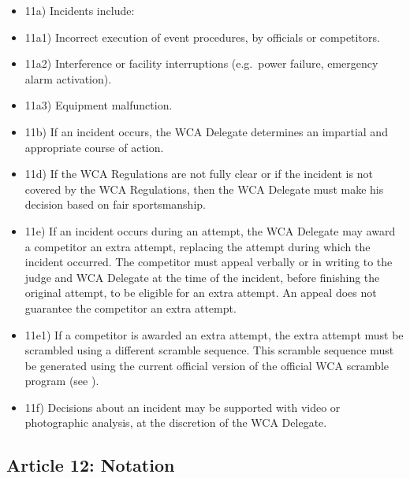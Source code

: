 \begin{itemize}
\item
  11a) Incidents include:
\item
  11a1) Incorrect execution of event procedures, by officials or
  competitors.
\item
  11a2) Interference or facility interruptions (e.g.~power failure,
  emergency alarm activation).
\item
  11a3) Equipment malfunction.
\item
  11b) If an incident occurs, the WCA Delegate determines an impartial
  and appropriate course of action.
\item
  11d) If the WCA Regulations are not fully clear or if the incident is
  not covered by the WCA Regulations, then the WCA Delegate must make
  his decision based on fair sportsmanship.
\item
  11e) If an incident occurs during an attempt, the WCA Delegate may
  award a competitor an extra attempt, replacing the attempt during
  which the incident occurred. The competitor must appeal verbally or in
  writing to the judge and WCA Delegate at the time of the incident,
  before finishing the original attempt, to be eligible for an extra
  attempt. An appeal does not guarantee the competitor an extra attempt.
\item
  11e1) If a competitor is awarded an extra attempt, the extra attempt
  must be scrambled using a different scramble sequence. This scramble
  sequence must be generated using the current official version of the
  official WCA scramble program (see ).
\item
  11f) Decisions about an incident may be supported with video or
  photographic analysis, at the discretion of the WCA Delegate.
\end{itemize}

\subsection{ Article 12: Notation}

